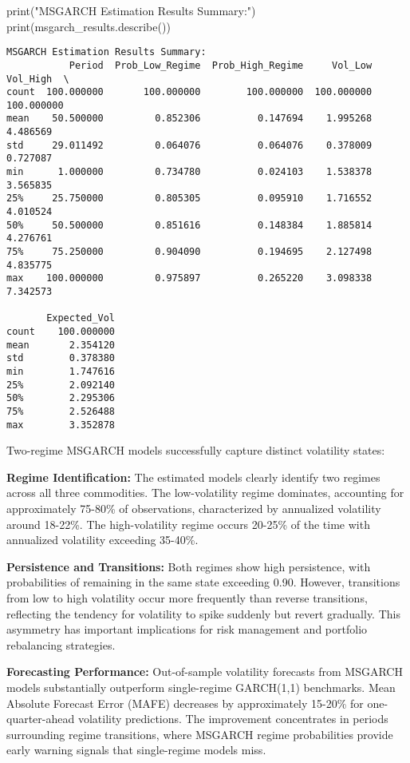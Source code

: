 \documentclass[
  10pt,
  a4paper,
]{article}
\newenvironment{Shaded}{\begin{snugshade}}{\end{snugshade}}
\newcommand{\BuiltInTok}[1]{\textcolor[rgb]{0.00,0.23,0.31}{#1}}
\newcommand{\NormalTok}[1]{\textcolor[rgb]{0.00,0.23,0.31}{#1}}
\newcommand{\StringTok}[1]{\textcolor[rgb]{0.13,0.47,0.30}{#1}}
\begin{document}
\begin{tcolorbox}
\begin{Shaded}
\begin{Highlighting}[]
\BuiltInTok{print}\NormalTok{(}\StringTok{"MSGARCH Estimation Results Summary:"}\NormalTok{)}
\BuiltInTok{print}\NormalTok{(msgarch\_results.describe())}
\end{Highlighting}
\end{Shaded}

\begin{verbatim}
MSGARCH Estimation Results Summary:
           Period  Prob_Low_Regime  Prob_High_Regime     Vol_Low    Vol_High  \
count  100.000000       100.000000        100.000000  100.000000  100.000000   
mean    50.500000         0.852306          0.147694    1.995268    4.486569   
std     29.011492         0.064076          0.064076    0.378009    0.727087   
min      1.000000         0.734780          0.024103    1.538378    3.565835   
25%     25.750000         0.805305          0.095910    1.716552    4.010524   
50%     50.500000         0.851616          0.148384    1.885814    4.276761   
75%     75.250000         0.904090          0.194695    2.127498    4.835775   
max    100.000000         0.975897          0.265220    3.098338    7.342573   

       Expected_Vol  
count    100.000000  
mean       2.354120  
std        0.378380  
min        1.747616  
25%        2.092140  
50%        2.295306  
75%        2.526488  
max        3.352878  
\end{verbatim}

Two-regime MSGARCH models successfully capture distinct volatility
states:

\textbf{Regime Identification:} The estimated models clearly identify
two regimes across all three commodities. The low-volatility regime
dominates, accounting for approximately 75-80\% of observations,
characterized by annualized volatility around 18-22\%. The
high-volatility regime occurs 20-25\% of the time with annualized
volatility exceeding 35-40\%.

\textbf{Persistence and Transitions:} Both regimes show high
persistence, with probabilities of remaining in the same state exceeding
0.90. However, transitions from low to high volatility occur more
frequently than reverse transitions, reflecting the tendency for
volatility to spike suddenly but revert gradually. This asymmetry has
important implications for risk management and portfolio rebalancing
strategies.

\textbf{Forecasting Performance:} Out-of-sample volatility forecasts
from MSGARCH models substantially outperform single-regime GARCH(1,1)
benchmarks. Mean Absolute Forecast Error (MAFE) decreases by
approximately 15-20\% for one-quarter-ahead volatility predictions. The
improvement concentrates in periods surrounding regime transitions,
where MSGARCH regime probabilities provide early warning signals that
single-regime models miss.


\end{tcolorbox}
\end{document}
